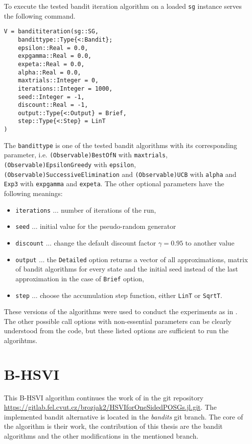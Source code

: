 \documentclass[../main.tex]{subfiles}
\begin{document}
To execute the tested bandit iteration algorithm on a loaded \texttt{sg} instance serves the following command.
\begin{lstlisting}
V = bandititeration(sg::SG,
    bandittype::Type{<:Bandit};
    epsilon::Real = 0.0,
    expgamma::Real = 0.0,
    expeta::Real = 0.0,
    alpha::Real = 0.0,
    maxtrials::Integer = 0,
    iterations::Integer = 1000,
    seed::Integer = -1,
    discount::Real = -1,
    output::Type{<:Output} = Brief,
    step::Type{<:Step} = LinT
)
\end{lstlisting}
The \texttt{bandittype} is one of the tested bandit algorithms with its corresponding parameter, i.e. \texttt{(Observable)BestOfN} with \texttt{maxtrials}, \texttt{(Observable)EpsilonGreedy} with \texttt{epsilon}, \texttt{(Observable)SuccessiveElimination} and \texttt{(Observable)UCB} with \texttt{alpha} and \texttt{Exp3} with \texttt{expgamma} and \texttt{expeta}.
The other optional parameters have the following meanings:
\begin{itemize}
    \item \texttt{iterations} $\dots$ number of iterations of the run,
    \item \texttt{seed} $\dots$ initial value for the pseudo-random generator
    \item \texttt{discount} $\dots$ change the default discount factor $\gamma = 0.95$ to another value
    \item \texttt{output} $\dots$ the \texttt{Detailed} option returns a vector of all approximations, matrix of bandit algorithms for every state and the initial seed instead of the last approximation in the case of \texttt{Brief} option,
    \item \texttt{step} $\dots$ choose the accumulation step function, either \texttt{LinT} or \texttt{SqrtT}.
\end{itemize}

These versions of the algorithms were used to conduct the experiments as in .
The other possible call options with non-essential parameters can be clearly understood from the code, but these listed options are sufficient to run the algorihtms.

\section{B-HSVI}
This B-HSVI algorithm continues the work of \cite{gitlab} in the git repository \url{https://gitlab.fel.cvut.cz/brozjak2/HSVIforOneSidedPOSGs.jl.git}.
The implemented bandit alternative is located in the \textit{bandits} git branch.
The core of the algorithm is their work, the contribution of this thesis are the bandit algorithms and the other modifications in the mentioned branch.
\end{document}
